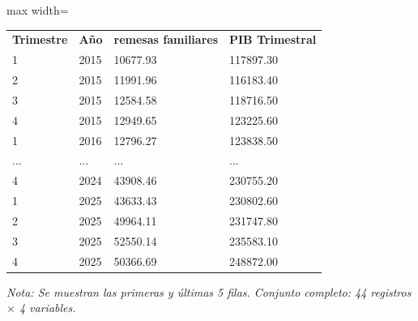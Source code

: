 

\begin{table}[htbp]

\centering

\begin{adjustbox}{max width=\textwidth}

\begin{tabular}{llll}

\rowcolor{ThemeBackground}
\rule{0pt}{0.45cm}
\textcolor{ThemeGold}{\bfseries Trimestre} & \textcolor{ThemeGold}{\bfseries Año} & \textcolor{ThemeGold}{\bfseries remesas familiares} & \textcolor{ThemeGold}{\bfseries PIB Trimestral} \\

1 & 2015 & 10677.93 & 117897.30 \\
2 & 2015 & 11991.96 & 116183.40 \\
3 & 2015 & 12584.58 & 118716.50 \\
4 & 2015 & 12949.65 & 123225.60 \\
1 & 2016 & 12796.27 & 123838.50 \\
... & ... & ... & ... \\
4 & 2024 & 43908.46 & 230755.20 \\
1 & 2025 & 43633.43 & 230802.60 \\
2 & 2025 & 49964.11 & 231747.80 \\
3 & 2025 & 52550.14 & 235583.10 \\
4 & 2025 & 50366.69 & 248872.00 \\
\bottomrule
\end{tabular}

\end{adjustbox}

\vspace{0.15cm}
{\raggedright\sffamily\footnotesize\color{ThemeMuted}
\textit{Nota: Se muestran las primeras y últimas 5 filas. Conjunto completo: 44 registros $\times$ 4 variables.}}

\end{table}
